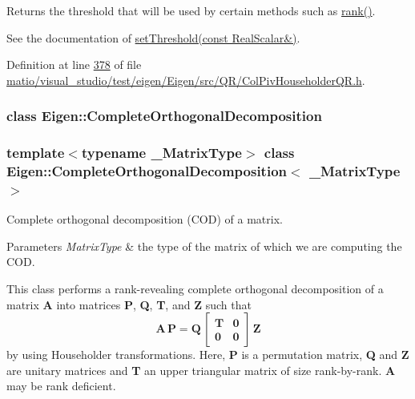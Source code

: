 Returns the threshold that will be used by certain methods such as \hyperlink{group___q_r___module_a2a59aaa689613ce5ef0c9130ad33940e}{rank()}.

See the documentation of \hyperlink{group___q_r___module_ae712cdc9f0e521cfc8061bee58ff55ee}{set\+Threshold(const Real\+Scalar\&)}. 

Definition at line \hyperlink{matio_2visual__studio_2test_2eigen_2_eigen_2src_2_q_r_2_col_piv_householder_q_r_8h_source_l00378}{378} of file \hyperlink{matio_2visual__studio_2test_2eigen_2_eigen_2src_2_q_r_2_col_piv_householder_q_r_8h_source}{matio/visual\+\_\+studio/test/eigen/\+Eigen/src/\+Q\+R/\+Col\+Piv\+Householder\+Q\+R.\+h}.

\label{class_eigen_1_1_complete_orthogonal_decomposition}
\subsubsection{class Eigen\+:\+:Complete\+Orthogonal\+Decomposition}
\subsubsection*{template$<$typename \+\_\+\+Matrix\+Type$>$\newline
class Eigen\+::\+Complete\+Orthogonal\+Decomposition$<$ \+\_\+\+Matrix\+Type $>$}

Complete orthogonal decomposition (C\+OD) of a matrix. 


\begin{DoxyParams}{Parameters}
{\em Matrix\+Type} & the type of the matrix of which we are computing the C\+OD.\\
\hline
\end{DoxyParams}
This class performs a rank-\/revealing complete orthogonal decomposition of a matrix {\bfseries A} into matrices {\bfseries P}, {\bfseries Q}, {\bfseries T}, and {\bfseries Z} such that \[ \mathbf{A} \, \mathbf{P} = \mathbf{Q} \, \begin{bmatrix} \mathbf{T} & \mathbf{0} \\ \mathbf{0} & \mathbf{0} \end{bmatrix} \, \mathbf{Z} \] by using Householder transformations. Here, {\bfseries P} is a permutation matrix, {\bfseries Q} and {\bfseries Z} are unitary matrices and {\bfseries T} an upper triangular matrix of size rank-\/by-\/rank. {\bfseries A} may be rank deficient.

